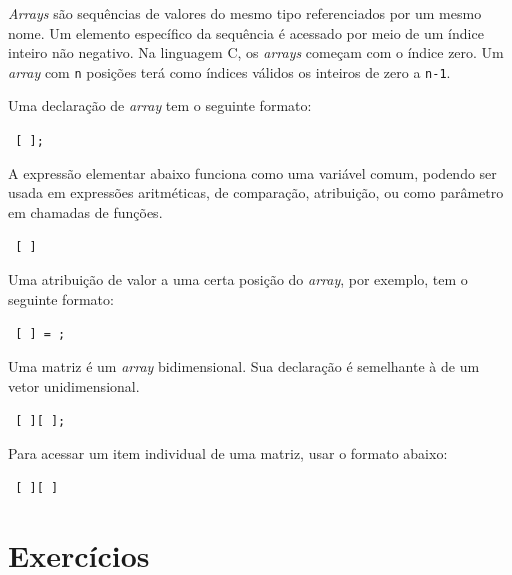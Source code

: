 \textit{Arrays} são sequências de valores do mesmo tipo referenciados por um mesmo nome. Um elemento específico da sequência é acessado por meio de um índice inteiro não negativo. Na linguagem C, os \textit{arrays} começam com o índice zero. Um \textit{array} com {\tt n} posições terá como índices válidos os inteiros de zero a {\tt n-1}.

Uma declaração de \textit{array} tem o seguinte formato:

\NEWLINE
{\tt
{}  [  ];
}
\NEWLINE

A expressão elementar abaixo funciona como uma variável comum, podendo ser usada em expressões aritméticas, de comparação, atribuição, ou como parâmetro em chamadas de funções.

\NEWLINE
{\tt
{} [  ]
}
\NEWLINE

Uma atribuição de valor a uma certa posição do \textit{array}, por exemplo, tem o seguinte formato:

\NEWLINE
{\tt
{} [  ] = ;
}
\NEWLINE


Uma matriz é um \textit{array} bidimensional. Sua declaração é semelhante à de um vetor unidimensional.

\NEWLINE
{\tt
{}  [  ][  ];
}
\NEWLINE


Para acessar um item individual de uma matriz, usar o formato abaixo:

\NEWLINE
{\tt
{} [  ][  ]      
}
\NEWLINE


\section{Exercícios}

